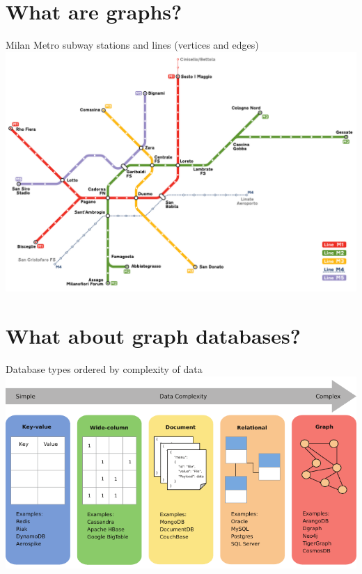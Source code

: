 \documentclass[aspectratio  =  169, 15pt]{beamer}
\begin{document}
    \section{What are graphs?}
    
    \begin{frame}{Milan Metro subway stations and lines (vertices and edges)}
        \centering
        \includegraphics[width = 0.78\paperwidth, height = 0.78\paperheight, keepaspectratio]{images/ch2/WikipediaMilanoMetro2021Graphedit.pdf}
    \end{frame}
    
    \section{What about graph databases?}
    
    \begin{frame}{Database types ordered by complexity of data}
        \centering
        \includegraphics[width = 0.78\paperwidth, height = 0.78\paperheight, keepaspectratio]{images/ch1/BechbergerPerryman2020page8.pdf}
    \end{frame}
    
\end{document}
